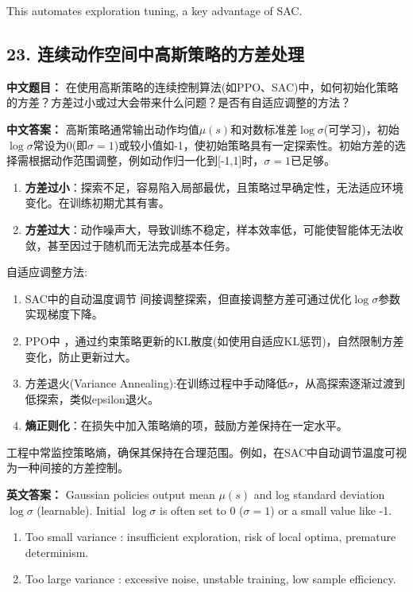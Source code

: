 \documentclass[10pt,a4paper]{ctexart}
\begin{document}
This automates exploration tuning, a key advantage of SAC.

\subsection*{23. 连续动作空间中高斯策略的方差处理}
\textbf{中文题目：} 在使用高斯策略的连续控制算法(如PPO、SAC)中，如何初始化策略的方差？方差过小或过大会带来什么问题？是否有自适应调整的方法？

\textbf{中文答案：}  
高斯策略通常输出动作均值\(\mu(s)\)和对数标准差\(\log\sigma\)(可学习)，初始\(\log\sigma\)常设为0(即\(\sigma=1\))或较小值如-1，使初始策略具有一定探索性。初始方差的选择需根据动作范围调整，例如动作归一化到[-1,1]时，\(\sigma=1\)已足够。

\begin{enumerate}
    \item \textbf{方差过小}：探索不足，容易陷入局部最优，且策略过早确定性，无法适应环境变化。在训练初期尤其有害。
    \item \textbf{方差过大}：动作噪声大，导致训练不稳定，样本效率低，可能使智能体无法收敛，甚至因过于随机而无法完成基本任务。
\end{enumerate}

 自适应调整方法:
\begin{enumerate}
    \item SAC中的自动温度调节 间接调整探索，但直接调整方差可通过优化\(\log\sigma\)参数实现梯度下降。
    \item PPO中 ，通过约束策略更新的KL散度(如使用自适应KL惩罚)，自然限制方差变化，防止更新过大。
    \item 方差退火(Variance Annealing):在训练过程中手动降低\(\sigma\)，从高探索逐渐过渡到低探索，类似epsilon退火。
    \item \textbf{熵正则化}：在损失中加入策略熵的项，鼓励方差保持在一定水平。
\end{enumerate}

工程中常监控策略熵，确保其保持在合理范围。例如，在SAC中自动调节温度可视为一种间接的方差控制。

\textbf{英文答案：}  
Gaussian policies output mean \(\mu(s)\) and log standard deviation \(\log\sigma\) (learnable). Initial \(\log\sigma\) is often set to 0 (\(\sigma=1\)) or a small value like -1.

\begin{enumerate}
    \item Too small variance : insufficient exploration, risk of local optima, premature determinism.
    \item Too large variance : excessive noise, unstable training, low sample efficiency.
\end{enumerate}
\end{document}
